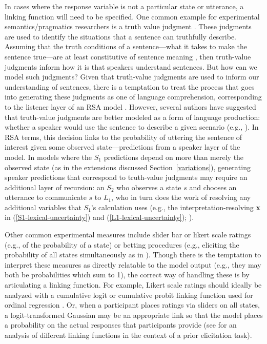 \documentclass{sp}
\begin{document}
In cases where the response variable is not a particular state or utterance, a linking function will need to be specified. One common example for experimental semantics/pragmatics researchers is a truth value judgment \citep{crainmckee1985,crainthornton1998}. These judgments are used to identify the situations that a sentence can truthfully describe. Assuming that the truth conditions of a sentence---what it takes to make the sentence true---are at least constitutive of sentence meaning \citep[e.g.,][]{chierchiamcconnellginet2000}, then truth-value judgments inform how it is that speakers understand sentences. But how can we model such judgments? Given that truth-value judgments are used to inform our understanding of sentences, there is a temptation to treat the process that goes into generating these judgments as one of language comprehension, corresponding to the listener layer of an RSA model \citep[e.g.,][]{PottsLassiter2016:Embedded-implic}. However, several authors have suggested that truth-value judgments are better modeled as a form of language production: whether a speaker would use the sentence to describe a given scenario (e.g., \citealp{degengoodman2014,Franke2016:Task-types-link,savinellietal2017,tesslergoodman2019,jasbietal2019}). In RSA terms, this decision links to the probability of uttering the sentence of interest given some observed state---predictions from a speaker layer of the model. In models where the $S_1$ predictions depend on more than merely the observed state (as in the extensions discussed Section~\ref{variations}), generating speaker predictions that correspond to truth-value judgments may require an additional layer of recursion: an $S_2$ who observes a state $s$ and chooses an utterance to communicate $s$ to $L_1$, who in turn does the work of resolving any additional variables that $S_1$'s calculation uses (e.g., the interpretation-resolving \textbf{x} in (\ref{S1-lexical-uncertainty}) and (\ref{L1-lexical-uncertainty}); \citealp{savinellietal2017}).

Other common experimental measures include slider bar or likert scale ratings (e.g., of the probability of a state) or betting procedures (e.g., eliciting the probability of all states simultaneously as in \citealp{frankgoodman2012}). 
Though there is the temptation to interpret these measures as directly relatable to the model output (e.g., they may both be probabilities which sum to 1), the correct way of handling these is by articulating a linking function.
For example, Likert scale ratings should ideally be analyzed with a cumulative logit or cumulative probit linking function used for ordinal regression \citep{Franke2014:Typical-use-of-,Franke2016:Task-types-link}.
Or, when a participant places ratings via sliders on all states, a logit-transformed Gaussian may be an appropriate link so that the model places a probability on the actual responses that participants provide (see \citealp{franke2016does} for an analysis of different linking functions in the context of a prior elicitation task).
\end{document}

